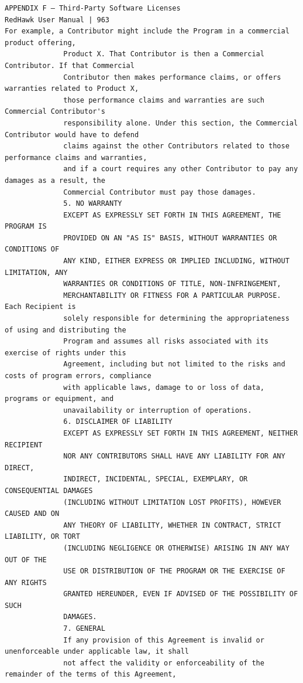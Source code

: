 \begin{lstlisting}[basicstyle=\ttfamily\scriptsize,breaklines=true]
APPENDIX F — Third-Party Software Licenses                                    RedHawk User Manual | 963
For example, a Contributor might include the Program in a commercial product offering,
              Product X. That Contributor is then a Commercial Contributor. If that Commercial
              Contributor then makes performance claims, or offers warranties related to Product X,
              those performance claims and warranties are such Commercial Contributor's
              responsibility alone. Under this section, the Commercial Contributor would have to defend
              claims against the other Contributors related to those performance claims and warranties,
              and if a court requires any other Contributor to pay any damages as a result, the
              Commercial Contributor must pay those damages.
              5. NO WARRANTY
              EXCEPT AS EXPRESSLY SET FORTH IN THIS AGREEMENT, THE PROGRAM IS
              PROVIDED ON AN "AS IS" BASIS, WITHOUT WARRANTIES OR CONDITIONS OF
              ANY KIND, EITHER EXPRESS OR IMPLIED INCLUDING, WITHOUT LIMITATION, ANY
              WARRANTIES OR CONDITIONS OF TITLE, NON-INFRINGEMENT,
              MERCHANTABILITY OR FITNESS FOR A PARTICULAR PURPOSE. Each Recipient is
              solely responsible for determining the appropriateness of using and distributing the
              Program and assumes all risks associated with its exercise of rights under this
              Agreement, including but not limited to the risks and costs of program errors, compliance
              with applicable laws, damage to or loss of data, programs or equipment, and
              unavailability or interruption of operations.
              6. DISCLAIMER OF LIABILITY
              EXCEPT AS EXPRESSLY SET FORTH IN THIS AGREEMENT, NEITHER RECIPIENT
              NOR ANY CONTRIBUTORS SHALL HAVE ANY LIABILITY FOR ANY DIRECT,
              INDIRECT, INCIDENTAL, SPECIAL, EXEMPLARY, OR CONSEQUENTIAL DAMAGES
              (INCLUDING WITHOUT LIMITATION LOST PROFITS), HOWEVER CAUSED AND ON
              ANY THEORY OF LIABILITY, WHETHER IN CONTRACT, STRICT LIABILITY, OR TORT
              (INCLUDING NEGLIGENCE OR OTHERWISE) ARISING IN ANY WAY OUT OF THE
              USE OR DISTRIBUTION OF THE PROGRAM OR THE EXERCISE OF ANY RIGHTS
              GRANTED HEREUNDER, EVEN IF ADVISED OF THE POSSIBILITY OF SUCH
              DAMAGES.
              7. GENERAL
              If any provision of this Agreement is invalid or unenforceable under applicable law, it shall
              not affect the validity or enforceability of the remainder of the terms of this Agreement,

\end{lstlisting}
